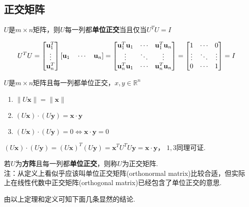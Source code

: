 \subsection{正交矩阵}
\begin{theorem}
$U$是$m\times n$矩阵，则$U$每一列都\textbf{单位正交}当且仅当$U^TU=I$
\end{theorem}
\begin{analysis}
\[U^TU=\begin{bmatrix}\mathbf{u}_1^T\\\vdots\\\mathbf{u}_n^T\end{bmatrix}[\mathbf{u}_1\quad\cdots\quad\mathbf{u}_n]
=\begin{bmatrix}\mathbf{u}_1^T\mathbf{u}_1 & \cdots & \mathbf{u}_1^T\mathbf{u}_n\\
\vdots&\ddots&\vdots\\
\mathbf{u}_n^T\mathbf{u}_1 & \cdots & \mathbf{u}_n^T\mathbf{u}_n\\\end{bmatrix}
=\begin{bmatrix}1 & \cdots & 0\\
\vdots&\ddots&\vdots\\
0 & \cdots & 1\\\end{bmatrix}=I\]
\end{analysis}
\begin{theorem}
$U$是$m\times n$矩阵且每一列都单位正交，$x,y\in\mathbb{R}^n$
\begin{enumerate}
	\itemsep -3pt
	\item $\|U\mathbf{x}\|=\|\mathbf{x}\|$
	\item $(U\mathbf{x})\cdot(U\mathbf{y})=\mathbf{x}\cdot\mathbf{y}$
	\item $(U\mathbf{x})\cdot(U\mathbf{y})=0\iff\mathbf{x}\cdot\mathbf{y}=0$
\end{enumerate}
\end{theorem}
\begin{analysis}
$(U\mathbf{x})\cdot(U\mathbf{y})=(U\mathbf{x})^T(U\mathbf{y})=\mathbf{x}^TU^TU\mathbf{y}=\mathbf{x}\cdot\mathbf{y}$，
$1,3$同理可证.
\end{analysis}
\begin{definition}[正交矩阵]
若$U$为\textbf{方阵}且每一列都\textbf{单位正交}，则称$U$为正交矩阵.\\
注：从定义上看似乎应该叫单位正交矩阵(orthonormal matrix)比较合适，但实际上在线性代数中正交矩阵(orthogonal matrix)已经包含了单位正交的意思.
\end{definition}
由以上定理和定义可知下面几条显然的结论.
